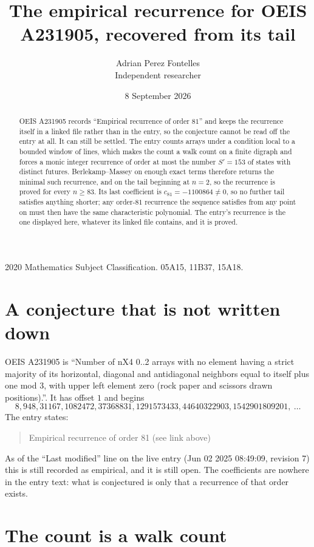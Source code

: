 \documentclass[11pt,a4paper]{article}
\title{The empirical recurrence for OEIS A231905, recovered from its tail}
\author{Adrian Perez Fontelles\\ \small Independent researcher}
\date{8 September 2026}
\theoremstyle{plain}
\theoremstyle{definition}
\begin{document}
\maketitle

\begin{abstract}
OEIS A231905 records ``Empirical recurrence of order $81$'' and keeps the recurrence itself in
a linked file rather than in the entry, so the conjecture cannot be read off the entry at all.
It can still be settled. The entry counts arrays under a condition local to a bounded window of
lines, which makes the count a walk count on a finite digraph and forces a monic integer
recurrence of order at most the number $S'=153$ of states with distinct futures. Berlekamp--Massey on
enough exact terms therefore returns the minimal such recurrence, and on the tail beginning at $n=2$, so the recurrence is proved for every $n\ge83$.
Its last coefficient is $c_{81}=-1100864\neq0$, so no further tail satisfies anything
shorter; any order-$81$ recurrence the sequence satisfies from any point on must then have
the same characteristic polynomial. The entry's recurrence is the one displayed here, whatever
its linked file contains, and it is proved.
\end{abstract}

\noindent\small 2020 Mathematics Subject Classification. 05A15, 11B37, 15A18.\normalsize

\section{A conjecture that is not written down}

OEIS A231905 is ``Number of nX4 0..2 arrays with no element having a strict majority of its horizontal, diagonal and antidiagonal neighbors equal to itself plus one mod 3, with upper left element zero (rock paper and scissors drawn positions).''. It has offset $1$ and begins
\[
8, 948, 31167, 1082472, 37368831, 1291573433, 44640322903, 1542901809201,\ \dots
\]
The entry states:
\begin{quote}
Empirical recurrence of order 81 (see link above)
\end{quote}
As of the ``Last modified'' line on the live entry (Jun 02 2025 08:49:09, revision 7)
this is still recorded as empirical, and it is still open. The coefficients are nowhere in the
entry text: what is conjectured is only that a recurrence of that order exists.

\section{The count is a walk count}
\end{document}
